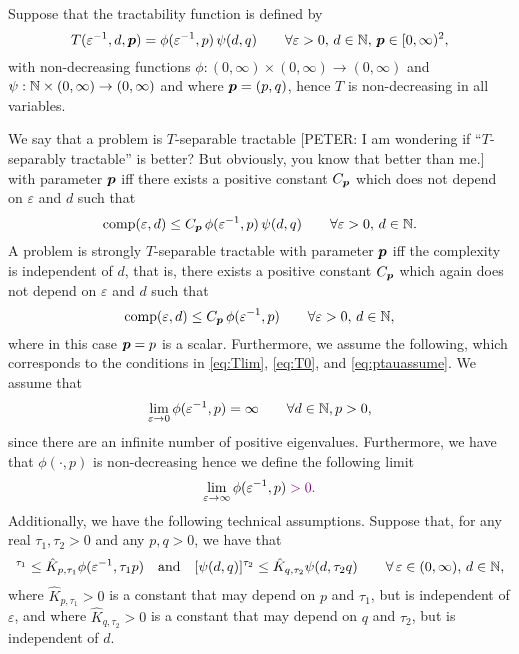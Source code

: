 \documentclass[sort&compress]{elsarticle}
\newcommand{\peter}[1]{\begingroup\color{violet}#1\endgroup}
\begin{document}
\begin{example}
Suppose that the tractability function is defined by
\[
 T(\varepsilon^{-1},d,\boldsymbol{p})= \phi(\varepsilon^{-1},p)\, \psi(d,q)
 \qquad \forall \varepsilon > 0, \,  d \in \mathbb{N}, \, \boldsymbol{p} \in [0,\infty)^2,
\]
with non-decreasing functions $\phi : (0,\infty) \times (0,\infty) \to (0,\infty)$ and $\psi : \mathbb{N}  \times (0,\infty) \to (0,\infty)$ and where $\boldsymbol{p} = (p,q)$, hence $T$ is non-decreasing in all variables.

We say that a problem is $T$-separable tractable \peter{[PETER: I am wondering if ``$T$-separably tractable'' is better? But obviously, you know that better than me.]} with parameter $\boldsymbol{p}$ iff there exists a positive constant $C_{\boldsymbol{p}}$ which does not depend on $\varepsilon$ and $d$ such that
\[
\operatorname{comp}(\varepsilon,d) \leq  C_{\boldsymbol{p}} \,  \phi(\varepsilon^{-1},p)\, \psi(d,q)\qquad \forall \varepsilon >0, \, d\in\mathbb{N}.
\]
A problem is strongly $T$-separable tractable with parameter $\boldsymbol{p}$ iff the complexity is independent of $d$, that is, there exists a positive constant $C_{\boldsymbol{p}}$ which again does not depend on $\varepsilon$ and $d$ such that
\[
\operatorname{comp}(\varepsilon,d) \leq C_{\boldsymbol{p}}\,\phi(\varepsilon^{-1},p)\qquad \forall \varepsilon >0, \, d\in\mathbb{N},
\] where in this case $\boldsymbol{p} = p$ is a scalar. 
Furthermore, we assume the following, \peter{which corresponds to the conditions} in \eqref{eq:Tlim}, \eqref{eq:T0}, and \eqref{eq:ptauassume}. We assume that
\[
\lim_{\varepsilon\rightarrow0}\phi(\varepsilon^{-1},p) = \infty \qquad \forall d\in\mathbb{N}, p >0,
\] 
since there are an infinite number of positive eigenvalues. Furthermore, we have that $\phi(\cdot,p)$ is non-decreasing hence we define the following limit
\[ 
\lim_{\varepsilon \rightarrow \infty}\phi(\varepsilon^{-1},p) \peter{>0.}
\] 
Additionally, we have the following technical assumptions. Suppose that, for any real $\tau_1, \tau_2>0$ and any $p,q>0$, we have that 
\begin{align*}
     [\phi(\varepsilon^{-1},p)]^{\tau_1} \le \hat{K}_{p,\tau_1} \phi (\varepsilon^{-1},\tau_1 p)
     \quad \mbox{and} \quad
      [\psi(d,q)]^{\tau_2} \le \hat{K}_{q,\tau_2} \psi (d,\tau_2 q) \qquad \forall \, \varepsilon \in (0,\infty),\, d\in \naturals,
\end{align*} where $\hat{K}_{p,\tau_1}>0$ is a constant that may depend on $p$ and $\tau_1$, but is independent of $\varepsilon$, and where $\hat{K}_{q,\tau_2}>0$ is a constant that may depend on $q$ and $\tau_2$, but is independent of $d$.


\end{example}
\end{document}

